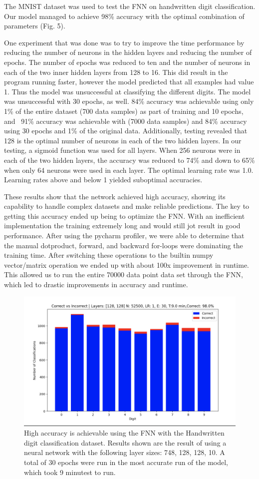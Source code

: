 \documentclass{article}
\begin{document}
The MNIST dataset was used to test the FNN on handwritten digit classification. Our model managed to achieve 98\% accuracy with the optimal combination of parameters (Fig. 5). 

One experiment that was done was to try to improve the time performance by reducing the number of neurons in the hidden layers and reducing the number of epochs. The number of epochs was reduced to ten and the number of neurons in each of the two inner hidden layers from 128 to 16. This did result in the program running faster, however the model predicted that all examples had value 1. Thus the model was unsuccessful at classifying the different digits. The model was unsuccessful with 30 epochs, as well. 84\% accuracy was achievable using only 1\% of the entire dataset (700 data samples) as part of training and 10 epochs, and ~91\% accuracy was achievable with (7000 data samples) and 84\% accuracy using 30 epochs and 1\% of the original data. Additionally, testing revealed that 128 is the optimal number of neurons in each of the two hidden layers. In our testing, a sigmoid function was used for all layers. When 256 neurons were in each of the two hidden layers, the accuracy was reduced to 74\% and down to 65\% when only 64 neurons were used in each layer. The optimal learning rate was 1.0. Learning rates above and below 1 yielded suboptimal accuracies.

These results show that the network achieved high accuracy, showing its capability to handle complex datasets and make reliable predictions. The key to getting this accuracy ended up being to optimize the FNN. With an inefficient implementation the training extremely long and would still jot result in good performance. After using the pycharm profiler, we were able to determine that the manual dotproduct, forward, and backward for-loops were dominating the training time. After switching these operations to the builtin numpy vector/matrix operation we ended up with about 100x improvement in runtime. This allowed us to run the entire 70000 data point data set through the FNN, which led to drastic improvements in accuracy and runtime.

\begin{figure}
    \centering
    \includegraphics[width=0.5\linewidth]{image.png}
    \caption{High accuracy is achievable using the FNN with the Handwritten digit classification dataset. Results shown are the result of using a neural network with the following layer sizes: 748, 128, 128, 10. A total of 30 epochs were run in the most accurate run of the model, which took 9 minutest to run.}
\end{figure}
\end{document}
